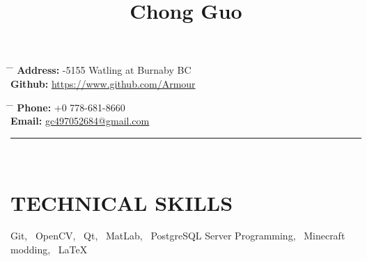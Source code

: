 \documentclass[10pt]{article} %
\begin{document}

\title{Chong Guo} %


\parbox{0.5\textwidth}{ %
\begin{tabbing} %
\hspace{3cm} \= \hspace{4cm} \= \kill %
{\bf Address:} -5155 Watling at Burnaby BC \\[2mm] %
{\bf Github:} \> \href{https://www.github.com/Armour}{https://www.github.com/Armour} \\ %
\end{tabbing}
\vspace{-3mm}
}
\hfill %
\parbox{0.5\textwidth}{ %
\begin{tabbing} %
\hspace{3cm} \= \hspace{4cm} \= \kill %
{\bf Phone:} \> +0 778-681-8660 \\[2mm] %
{\bf Email:} \> \href{mailto:gc497052684@gmail.com}{gc497052684@gmail.com} \\ %
\end{tabbing}
\vspace{-3mm}
}
\rule{\textwidth}{0.5mm}\\ %
\vspace{-2mm}


\section{TECHNICAL SKILLS}
\vspace{-2mm}
 {Git, \ OpenCV, \ Qt, \ MatLab, \ PostgreSQL Server Programming, \ Minecraft modding, \ \LaTeX}
\end{document}
